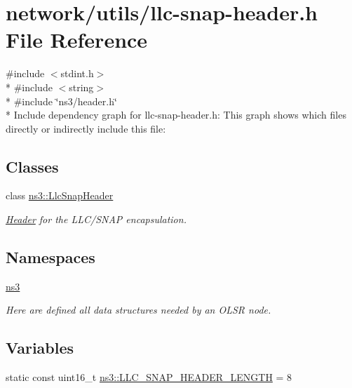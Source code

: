 \hypertarget{llc-snap-header_8h}{}\section{network/utils/llc-\/snap-\/header.h File Reference}
\label{llc-snap-header_8h}
{\ttfamily \#include $<$stdint.\+h$>$}\\*
{\ttfamily \#include $<$string$>$}\\*
{\ttfamily \#include \char`\"{}ns3/header.\+h\char`\"{}}\\*
Include dependency graph for llc-\/snap-\/header.h\+:
This graph shows which files directly or indirectly include this file\+:
\subsection*{Classes}
\begin{DoxyCompactItemize}
\item 
class \hyperlink{classns3_1_1LlcSnapHeader}{ns3\+::\+Llc\+Snap\+Header}
\begin{DoxyCompactList}\small\item\em \hyperlink{classns3_1_1Header}{Header} for the L\+L\+C/\+S\+N\+AP encapsulation. \end{DoxyCompactList}\end{DoxyCompactItemize}
\subsection*{Namespaces}
\begin{DoxyCompactItemize}
\item 
 \hyperlink{namespacens3}{ns3}
\begin{DoxyCompactList}\small\item\em Here are defined all data structures needed by an O\+L\+SR node. \end{DoxyCompactList}\end{DoxyCompactItemize}
\subsection*{Variables}
\begin{DoxyCompactItemize}
\item 
static const uint16\+\_\+t \hyperlink{namespacens3_af8522e22bcdefd901bcf12e260491ec8}{ns3\+::\+L\+L\+C\+\_\+\+S\+N\+A\+P\+\_\+\+H\+E\+A\+D\+E\+R\+\_\+\+L\+E\+N\+G\+TH} = 8
\end{DoxyCompactItemize}
